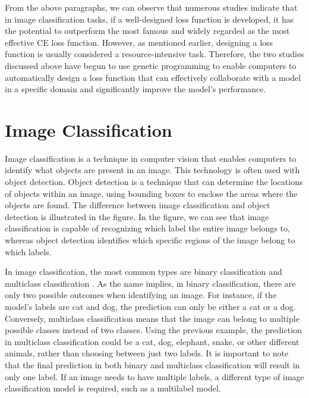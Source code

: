 \begin{ZhChapter}
    From the above paragraphs, we can observe that numerous studies indicate that in image classification tasks, if a well-designed loss function is developed, it has the potential to outperform the most famous and widely regarded as the most effective CE loss function. However, as mentioned earlier, designing a loss function is usually considered a resource-intensive task. Therefore, the two studies discussed above have begun to use genetic programming to enable computers to automatically design a loss function that can effectively collaborate with a model in a specific domain and significantly improve the model's performance.

    \section{Image Classification}
    Image classification is a technique in computer vision that enables computers to identify what objects are present in an image. This technology is often used  with object detection. Object detection \cite{zhao2019object} is a technique that can determine the locations of objects within an image, using bounding boxes \cite{he2019boundingboxregressionuncertainty} to enclose the areas where the objects are found. The difference between image classification and object detection is illustrated in the figure. In the figure, we can see that image classification is capable of recognizing which label the entire image belongs to, whereas object detection identifies which specific regions of the image belong to which labels.

    In image classification, the most common types are binary classification \cite{zhuang2019structured} and multiclass classification \cite{murthy2016deep}. As the name implies, in binary classification, there are only two possible outcomes when identifying an image. For instance, if the model's labels are cat and dog, the prediction can only be either a cat or a dog. Conversely, multiclass classification means that the image can belong to multiple possible classes instead of two classes. Using the previous example, the prediction in multiclass classification could be a cat, dog, elephant, snake, or other different animals, rather than choosing between just two labels. It is important to note that the final prediction in both binary and multiclass classification will result in only one label. If an image needs to have multiple labels, a different type of image classification model is required, such as a multilabel model.


\end{ZhChapter}

